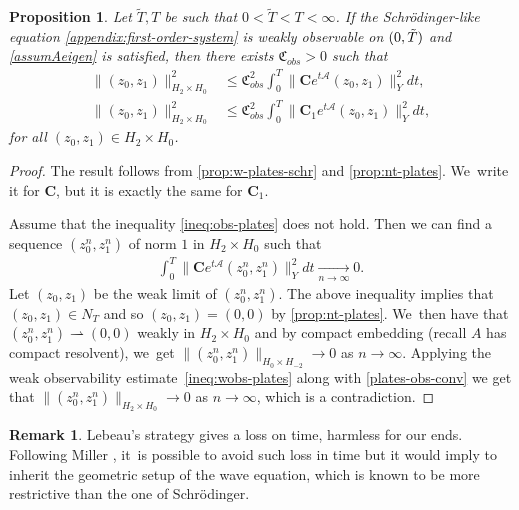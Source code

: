 \documentclass[JEP,XML,SOM,Unicode,published]{cedram}
\newtheorem{proposition}[theorem]{Proposition}
\theoremstyle{definition}
\newtheorem{remark}[theorem]{Remark}
\let\mc\mathcal
\let\wto\rightharpoonup
\newcommand{\A}{\mc{A}}
\newcommand{\bC}{\boldsymbol{C}}
\providecommand{\norm}[1]{\lVert#1\rVert}
\begin{document}
\begin{proposition}\label{prop:obs-schr-plates}
Let $\widetilde{T},T$ be such that $0 < \widetilde{T} < T < \infty$. If the Schrödinger-like equation
\eqref{appendix:first-order-system} is weakly observable on $(0, \Tilde{T})$ and \cref{assumAeigen} is satisfied, then there exists $\mathfrak{C}_{obs}>0$ such that
\begin{align}\label{ineq:obs-plates}
\norm{(z_0, z_1)}_{H_2\times H_0}^2&\leq \mathfrak{C}_{obs}^2\int_0^T \norm{\bC e^{t\A}(z_0, z_1)}_{Y}^2dt,\\
\label{ineq:obs-platesC1} \norm{(z_0, z_1)}_{H_2\times H_0}^2&\leq \mathfrak{C}_{obs}^2\int_0^T \norm{\bC_1 e^{t\A}(z_0, z_1)}_{Y}^2dt,
\end{align}
for all $(z_0, z_1)\in H_2\times H_0$.
\end{proposition}
\begin{proof}
The result follows from \cref{prop:w-plates-schr} and \cref{prop:nt-plates}. We~write it for $\bC$, but it is exactly the same for $\bC_1$.

Assume that the inequality \eqref{ineq:obs-plates} does not hold. Then we can find a sequence $(z_0^n, z_1^n)$ of norm $1$ in $H_2\times H_0$ such that
\begin{align}\label{plates-obs-conv}
\int_0^T \norm{\bC e^{t\A}(z_0^n, z_1^n)}_{Y}^2 dt\xrightarrow[n\to\infty]{} 0.
\end{align}
Let $(z_0, z_1)$ be the weak limit of $(z_0^n, z_1^n)$. The above inequality implies that $(z_0, z_1)\in N_T$ and so $(z_0, z_1)=(0, 0)$ by \cref{prop:nt-plates}. We~then have that $(z_0^n, z_1^n)\wto (0, 0)$ weakly in $H_2\times H_0$ and by compact embedding (recall $A$ has compact resolvent), we~get $\norm{(z_0^n, z_1^n)}_{H_0\times H_{-2}}\to 0$ as $n\to \infty$. Applying the weak observability estimate~\eqref{ineq:wobs-plates} along with \eqref{plates-obs-conv} we get that $\norm{(z_0^n, z_1^n)}_{H_2\times H_0}\to 0$ as $n\to \infty$, which is a contradiction.
\end{proof}

\begin{remark}
Lebeau's strategy gives a loss on time, harmless for our ends. Following Miller \cite{2012:miller:resolvent-control}, it~is possible to avoid such loss in time but it would imply to inherit the geometric setup of the wave equation, which is known to be more restrictive than the one of Schrödinger.
\end{remark}
\end{document}
